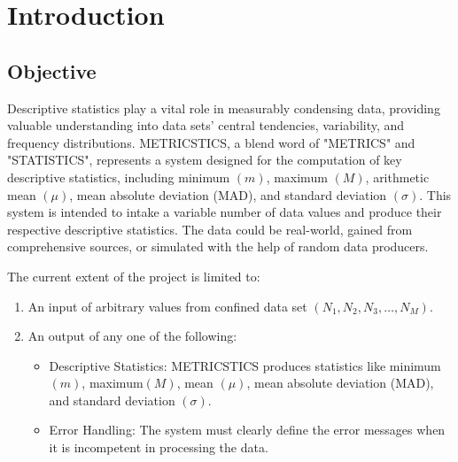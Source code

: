 \chapter{Introduction}

\section{Objective}
Descriptive statistics play a vital role in measurably condensing data, providing valuable understanding into data sets’ central tendencies, variability, and frequency distributions. \mbox{METRICSTICS}, a blend word of "METRICS" and "STATISTICS", represents a system designed for the \mbox{computation} of key descriptive statistics, including minimum $(m)$, maximum $(M)$, arithmetic mean $(\mu)$, mean absolute deviation (MAD), and standard deviation $(\sigma)$. This system is intended to intake a \mbox{variable} number of data values and produce their respective descriptive statistics. The data could be real-world, gained from comprehensive sources, or simulated with the help of random data producers.
\newline

\noindent The current extent of the project is limited to:
\begin{enumerate}
    \item An input of arbitrary values from confined data set $(N_1, N_2, N_3, \ldots,N_{M}).$
    \item An output of any one of the following:
    \begin{itemize}
        \item Descriptive Statistics: METRICSTICS produces statistics like minimum $(m)$, \mbox{maximum$(M)$}, mean $(\mu)$, mean absolute deviation (MAD), and standard deviation $(\sigma)$.
        \item Error Handling: The system must clearly define the error messages when it is \mbox{incompetent} in processing the data.
    \end{itemize}
\end{enumerate}